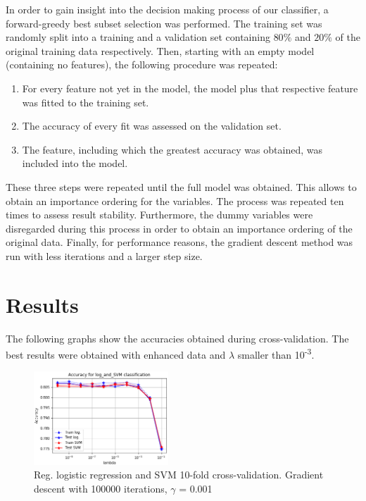 \documentclass[10pt,conference,compsocconf]{IEEEtran}
\begin{document}
\par
In order to gain insight into the decision making process of our classifier, a forward-greedy best subset selection was performed. The training set was randomly split into a training and a validation set containing $80\%$ and $20\%$ of the original training data respectively. Then, starting with an empty model (containing no features), the following procedure was repeated: 
\begin{enumerate}
	\item For every feature not yet in the model, the model plus that respective feature was fitted to the training set.
	\item The accuracy of every fit was assessed on the validation set.  
	\item The feature, including which the greatest accuracy was obtained, was included into the model.
\end{enumerate}
These three steps were repeated until the full model was obtained. This allows to obtain an importance ordering for the variables. The process was repeated ten times to assess result stability. Furthermore, the dummy variables were disregarded during this process in order to obtain an importance ordering of the original data. Finally, for performance reasons, the gradient descent method was run with less iterations and a larger step size.
\section*{Results}
The following graphs show the accuracies obtained during cross-validation. The best results were obtained with enhanced data and $\lambda$ smaller than 10\textsuperscript{-3}. 
\begin{figure}[H]
	\centering
	\includegraphics[width=0.45\textwidth]{accuracy_log_and_SVM.png}
	\caption{Reg. logistic regression and SVM 10-fold cross-validation. Gradient descent with 100000 iterations, $\gamma$ = 0.001}
\end{figure}
\end{document}
